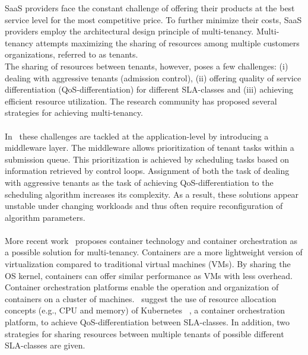 \noindent SaaS providers face the constant challenge of offering their products at the best service level for the most competitive price. To further minimize their costs, SaaS providers employ the architectural design principle of multi-tenancy. Multi-tenancy attempts  maximizing the sharing of resources among multiple customers organizations, referred to as tenants.\\

\noindent The sharing of resources between tenants, however, poses a few challenges: (i) dealing with aggressive tenants (admission control), (ii) offering quality of service differentiation (QoS-differentiation) for different SLA-classes and (iii) achieving efficient resource utilization. The research community has proposed several strategies for achieving multi-tenancy. \\\\

\noindent In~\cite{Walraven2015b} these challenges are tackled at the application-level by introducing a middleware layer. The middleware allows prioritization of tenant tasks within a submission queue. This prioritization is achieved by scheduling tasks based on information retrieved by control loops. Assignment of both the task of dealing with aggressive tenants as the task of achieving QoS-differentiation to the scheduling  algorithm increases its complexity. As a result, these solutions appear unstable under changing workloads and thus often require reconfiguration of algorithm parameters. 
\\\\
\noindent More recent work~\cite{TruyenEddy2016Taca} proposes container technology and  container orchestration as a possible solution for multi-tenancy. Containers are a more lightweight version of virtualization compared to traditional virtual machines (VMs). By sharing the OS kernel, containers can offer similar performance as VMs with less overhead. Container orchestration platforms enable the operation and organization of containers on  a cluster of machines.~\cite{TruyenEddy2016Taca} suggest the use of resource allocation concepts (e.g., CPU and memory) of Kubernetes ~\cite{kubernetes}, a container orchestration platform, to achieve QoS-differentiation between SLA-classes. In addition, two strategies for sharing resources between multiple tenants of possible different SLA-classes are given. 



